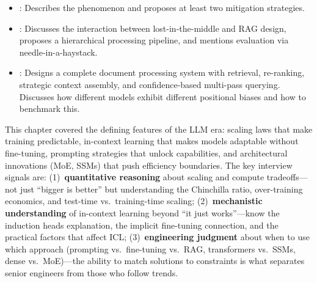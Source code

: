 \begin{interviewq}

\goodgreat
\begin{itemize}
\item {}: Describes the phenomenon and proposes at least two
  mitigation strategies.
\item {}: Discusses the interaction between lost-in-the-middle
  and RAG design, proposes a hierarchical processing pipeline, and
  mentions evaluation via needle-in-a-haystack.
\item {}: Designs a complete document processing system with
  retrieval, re-ranking, strategic context assembly, and confidence-based
  multi-pass querying.  Discusses how different models exhibit different
  positional biases and how to benchmark this.
\end{itemize}

\end{interviewq}

\bigskip
\begin{keyinsight}
This chapter covered the defining features of the LLM era: scaling laws that
make training predictable, in-context learning that makes models adaptable
without fine-tuning, prompting strategies that unlock capabilities, and
architectural innovations (MoE, SSMs) that push efficiency boundaries.  The
key interview signals are: (1)~\textbf{quantitative reasoning} about scaling
and compute tradeoffs---not just ``bigger is better'' but understanding the
Chinchilla ratio, over-training economics, and test-time vs.\ training-time
scaling; (2)~\textbf{mechanistic understanding} of in-context learning beyond
``it just works''---know the induction heads explanation, the implicit
fine-tuning connection, and the practical factors that affect ICL;
(3)~\textbf{engineering judgment} about when to use which approach (prompting
vs.\ fine-tuning vs.\ RAG, transformers vs.\ SSMs, dense vs.\ MoE)---the
ability to match solutions to constraints is what separates senior engineers
from those who follow trends.
\end{keyinsight}
